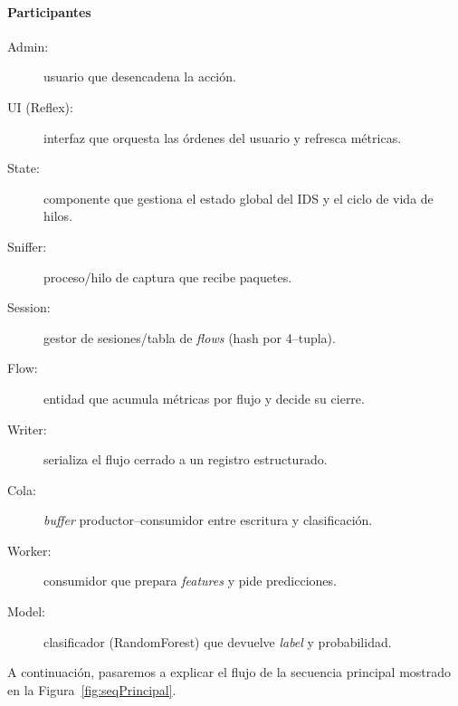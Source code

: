 \paragraph{Participantes}
\begin{description}
  \item[Admin:] usuario que desencadena la acción.
  \item[UI (Reflex):] interfaz que orquesta las órdenes del usuario y refresca métricas.
  \item[State:] componente que gestiona el estado global del IDS y el ciclo de vida de hilos.
  \item[Sniffer:] proceso/hilo de captura que recibe paquetes.
  \item[Session:] gestor de sesiones/tabla de \emph{flows} (hash por 4--tupla).
  \item[Flow:] entidad que acumula métricas por flujo y decide su cierre.
  \item[Writer:] serializa el flujo cerrado a un registro estructurado.
  \item[Cola:] \emph{buffer} productor--consumidor entre escritura y clasificación.
  \item[Worker:] consumidor que prepara \emph{features} y pide predicciones.
  \item[Model:] clasificador (RandomForest) que devuelve \emph{label} y probabilidad.
\end{description}

A continuación, pasaremos a explicar el flujo de la secuencia principal mostrado en la Figura~\ref{fig:seqPrincipal}.
